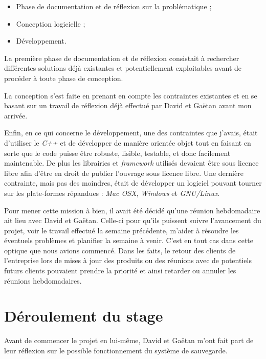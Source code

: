 \documentclass[a4paper,10pt, twoside]{report}
\begin{document}
\begin{spacing}{1.2}
\begin{itemize}
 \item Phase de documentation et de réflexion sur la problématique ;
 \item Conception logicielle ;
 \item Développement.
\end{itemize}

La première phase de documentation et de réflexion consistait à
rechercher différentes solutions déjà existantes et potentiellement
exploitables avant de procéder à toute phase de conception.

La conception s'est faite en prenant en compte les contraintes existantes
et en se basant sur un travail de réflexion déjà effectué par David et
Gaëtan avant mon arrivée.

Enfin, en ce qui concerne le développement, une des contraintes que j'avais,
était d'utiliser le \textit{C++} et de développer de manière orientée objet tout
en faisant en sorte que le code puisse être robuste, lisible, testable, et
donc facilement maintenable. De plus les librairies et \textit{framework}
utilisés devaient être sous licence libre afin d'être en droit de publier
l'ouvrage sous licence libre. Une dernière contrainte, mais pas des moindres,
était de développer un logiciel pouvant tourner sur les
plate-formes répandues : \textit{Mac OSX}, \textit{Windows} et
\textit{GNU/Linux}.

Pour mener cette mission à bien, il avait été décidé qu'une réunion
hebdomadaire ait lieu avec David et Gaëtan. Celle-ci pour qu'ils puissent
suivre l'avancement du projet, voir le travail effectué la semaine précédente,
m'aider à résoudre les éventuels problèmes et planifier la semaine à venir.
C'est en tout cas dans cette optique que nous avions commencé. Dans les
faits, le retour des clients de l'entreprise lors de mises à jour des produits
ou des réunions avec de potentiels futurs clients pouvaient prendre la
priorité et ainsi retarder ou annuler les réunions hebdomadaires.

\chapter{Déroulement du stage}
\thispagestyle{fancy}
Avant de commencer le projet en lui-même, David et Gaëtan m'ont fait part
de leur réflexion sur le possible fonctionnement du système de sauvegarde.


\end{spacing}
\end{document}
